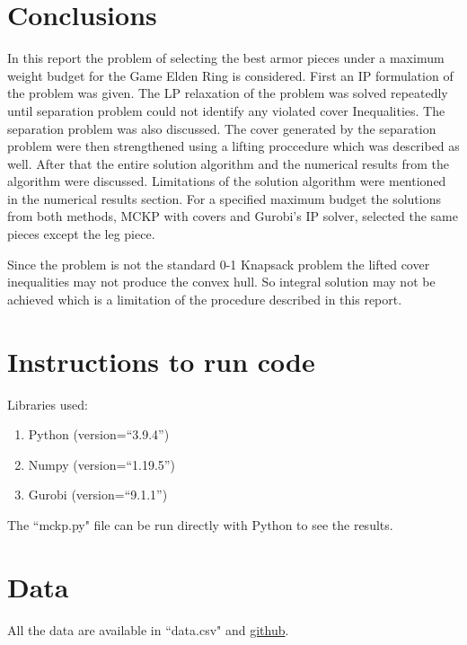 \documentclass[10pt]{article}
\begin{document}
    \section{Conclusions}
    In this report the problem of selecting the best armor pieces under a maximum weight budget for the Game Elden Ring
    is considered. First an IP formulation of the problem was given. The LP relaxation of the problem was solved
    repeatedly until separation problem could not identify any violated cover Inequalities. The separation problem was
    also discussed. The cover generated by the separation problem were then strengthened using a lifting proccedure
    which was described as well. After that the entire solution algorithm and the numerical results from the algorithm
    were discussed. Limitations of the solution algorithm were mentioned in the numerical results section. For a
    specified maximum budget the solutions from both methods, MCKP with covers and Gurobi's IP solver, selected the same
    pieces except the leg piece.
    
    Since the problem is not the standard 0-1 Knapsack problem the lifted cover inequalities may not produce the convex hull. So integral solution may not be achieved which is a limitation of the procedure described in this report.

    
    

    \vspace*{-10pt}

    \section*{Instructions to run code}
    Libraries used:
    \begin{enumerate}
        \item Python (version=``3.9.4'')
        \item Numpy (version=``1.19.5'')
        \item Gurobi (version=``9.1.1'')
    \end{enumerate}

    The ``mckp.py" file can be run directly with Python to see the results.

    \vspace*{-10pt}
    \section*{Data}
    All the data are available in ``data.csv" and \href{https://github.com/oureuphoriant/Elden_Ring_Armor_Calc}{github}.
\end{document}
